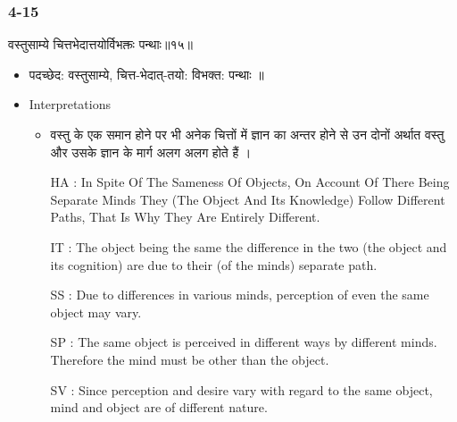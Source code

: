 \begin{frame}[fragile]\frametitle{4-15}
\begin{sanskrit}
वस्तुसाम्ये चित्तभेदात्तयोर्विभक्तः पन्थाः॥१५॥
\end{sanskrit}

	\begin{itemize}
	\item पदच्छेद:  वस्तुसाम्ये‌, चित्त-भेदात्-तयो: विभक्त: ‌पन्थाः ॥
	\item Interpretations
		\begin{itemize}	
		\item वस्तु के एक समान होने पर भी अनेक चित्तों में ज्ञान का अन्तर होने से उन दोनों अर्थात वस्तु और उसके ज्ञान के मार्ग अलग अलग होते हैं ।
		\item [HA]: In Spite Of The Sameness Of Objects, On Account Of There Being Separate Minds They (The Object And Its Knowledge) Follow Different Paths, That Is Why They Are Entirely Different.
		\item [IT]: The object being the same the difference in the two (the object and its cognition) are due to their (of the minds) separate path.
		\item [SS]: Due to differences in various minds, perception of even the same object may vary.
		\item [SP]: The same object is perceived in different ways by different minds. Therefore the mind must be other than the object.
		\item [SV]: Since perception and desire vary with regard to the same object, mind and object are of different nature. 
		\end{itemize}
	\end{itemize}
\end{frame}


